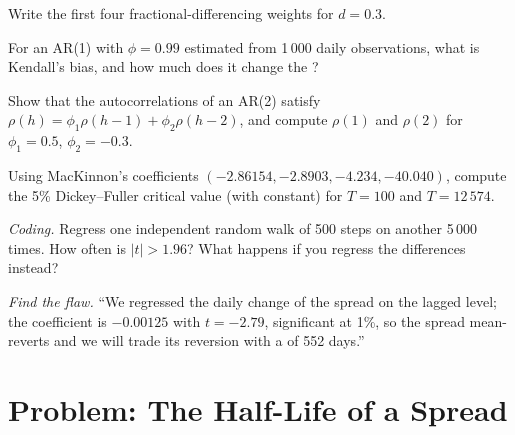 \begin{exercise}[$\star$]\label{exo:qm:linear-time-series:3}
Write the first four fractional-differencing weights for $d = 0.3$.
\end{exercise}

\begin{exercise}[$\star\star$]\label{exo:qm:linear-time-series:4}
For an AR(1) with $\phi = 0.99$ estimated from 1\,000 daily observations, what is Kendall's bias, and how much does it change the ?
\end{exercise}

\begin{exercise}[$\star\star$]\label{exo:qm:linear-time-series:5}
Show that the autocorrelations of an AR(2) satisfy $\rho(h) = \phi_1\rho(h - 1) + \phi_2\rho(h - 2)$, and compute $\rho(1)$ and $\rho(2)$ for $\phi_1 = 0.5$, $\phi_2 =
-0.3$.
\end{exercise}

\begin{exercise}[$\star\star$]\label{exo:qm:linear-time-series:6}
Using MacKinnon's coefficients $(-2.86154, -2.8903, -4.234, -40.040)$, compute the 5\% Dickey--Fuller critical value (with constant) for $T = 100$ and $T = 12\,574$.
\end{exercise}

\begin{exercise}[$\star\star\star$]\label{exo:qm:linear-time-series:7}
\emph{Coding.} Regress one independent random walk of 500 steps on another 5\,000 times. How often is $|t| > 1.96$? What happens if you regress the differences
instead?
\end{exercise}

\begin{exercise}[$\star\star\star$]\label{exo:qm:linear-time-series:8}
\emph{Find the flaw.} ``We regressed the daily change of the spread on the lagged level; the coefficient is $-0.00125$ with $t = -2.79$, significant at 1\%, so the
spread mean-reverts and we will trade its reversion with a  of 552 days.''
\end{exercise}

\section{Problem: The Half-Life of a Spread}

